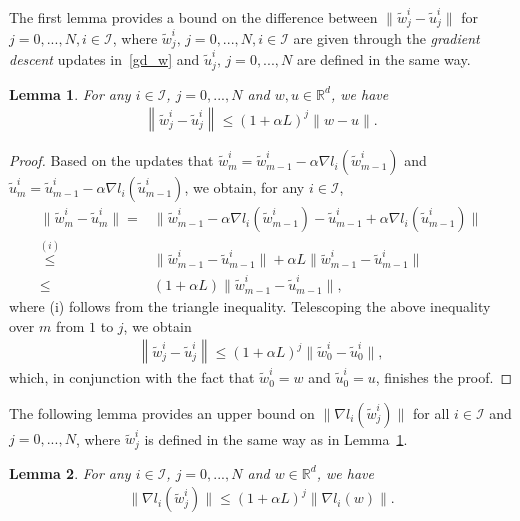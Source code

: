 \documentclass{osudissert96}
\newtheorem{lemma}{Lemma}
\begin{document}
The first lemma provides a bound on the difference between $\|\widetilde w_j^i - \widetilde u_j^i\|$ for $j=0,...,N,  i\in\mathcal{I}$, where $\widetilde w_j^i,\, j=0,...,N, i\in\mathcal{I}$ are given through the {\em gradient descent} updates in~\cref{gd_w} and  $\widetilde u_j^i,\, j=0,...,N$ are defined in the same way. 
\begin{lemma}\label{d_u_w}
	For any $i\in\mathcal{I}$, $j=0,...,N$ and $w,u \in \mathbb{R}^d$, we have 
	\begin{align*}
	\left\|\widetilde w_j^i -\widetilde  u_j^i\right\| \leq (1+\alpha L)^j \|w-u\|. 
	\end{align*}
\end{lemma}
\begin{proof}
	Based on the updates that $\widetilde w_m^i = \widetilde w_{m-1}^i - \alpha\nabla l_i(\widetilde w_{m-1}^i)$ and $\widetilde u_m^i = \widetilde u_{m-1}^i - \alpha\nabla l_i(\widetilde u_{m-1}^i)$, we obtain, for any $i \in\mathcal{I}$,
	\begin{align*}
	\|\widetilde w_m^i - \widetilde u_m^i\|  =& \|\widetilde w_{m-1}^i - \alpha\nabla l_i(\widetilde w_{m-1}^i) -\widetilde u_{m-1}^i + \alpha\nabla l_i(\widetilde u_{m-1}^i) \| \nonumber
	\\ \overset{(i)}\leq & \|\widetilde w_{m-1}^i -\widetilde u_{m-1}^i\| + \alpha L\|\widetilde w_{m-1}^i - \widetilde u_{m-1}^i\|  \nonumber
	\\ \leq & (1+\alpha L)  \|\widetilde w_{m-1}^i -\widetilde u_{m-1}^i\|,
	\end{align*} 
	where (i) follows from the triangle inequality. Telescoping the above inequality over $m$ from $1$ to $j$, we obtain 
	\begin{align*}
	\left\|\widetilde w_j^i - \widetilde u_j^i\right\| \leq (1+\alpha L)^j \|\widetilde w^i_0-\widetilde u^i_0\|, 
	\end{align*}
	which, in conjunction with the fact that $\widetilde w_0^i = w$ and $\widetilde u_0^i = u$, finishes the proof.
\end{proof}
The following lemma provides an upper bound on $\|\nabla l_i(\widetilde w_j^i)\|$ for all $i\in\mathcal{I}$ and $j=0,..., N$, where $\widetilde w_j^i$ is defined in the same way as in Lemma~\ref{d_u_w}. 
\begin{lemma}\label{le:jiw}
	For any $i\in\mathcal{I}$,  $j=0,...,N$ and $w \in \mathbb{R}^d$, we have 
	\begin{align*}
	\|\nabla l_i(\widetilde w_j^i)\| \leq (1+\alpha L)^j \|\nabla l_i(w)\|.
	\end{align*}
\end{lemma}
\end{document}
